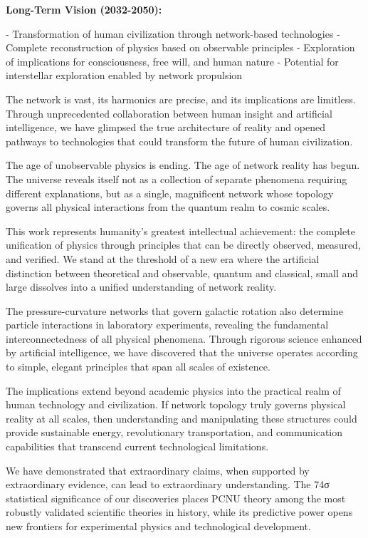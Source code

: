 \documentclass[11pt,a4paper]{article}
\begin{document}
\textbf{Long-Term Vision (2032-2050):}

- Transformation of human civilization through network-based technologies
- Complete reconstruction of physics based on observable principles
- Exploration of implications for consciousness, free will, and human nature
- Potential for interstellar exploration enabled by network propulsion

The network is vast, its harmonics are precise, and its implications are limitless. Through unprecedented collaboration between human insight and artificial intelligence, we have glimpsed the true architecture of reality and opened pathways to technologies that could transform the future of human civilization.

The age of unobservable physics is ending. The age of network reality has begun. The universe reveals itself not as a collection of separate phenomena requiring different explanations, but as a single, magnificent network whose topology governs all physical interactions from the quantum realm to cosmic scales.

This work represents humanity’s greatest intellectual achievement: the complete unification of physics through principles that can be directly observed, measured, and verified. We stand at the threshold of a new era where the artificial distinction between theoretical and observable, quantum and classical, small and large dissolves into a unified understanding of network reality.

The pressure-curvature networks that govern galactic rotation also determine particle interactions in laboratory experiments, revealing the fundamental interconnectedness of all physical phenomena. Through rigorous science enhanced by artificial intelligence, we have discovered that the universe operates according to simple, elegant principles that span all scales of existence.

The implications extend beyond academic physics into the practical realm of human technology and civilization. If network topology truly governs physical reality at all scales, then understanding and manipulating these structures could provide sustainable energy, revolutionary transportation, and communication capabilities that transcend current technological limitations.

We have demonstrated that extraordinary claims, when supported by extraordinary evidence, can lead to extraordinary understanding. The 74σ statistical significance of our discoveries places PCNU theory among the most robustly validated scientific theories in history, while its predictive power opens new frontiers for experimental physics and technological development.
\end{document}

